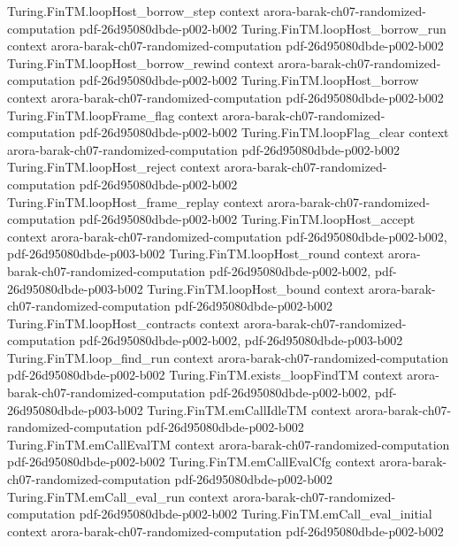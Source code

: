 \begin{theorem}
  {Turing.FinTM.loopHost_borrow_step}
  {context}
  {arora-barak-ch07-randomized-computation}
  {pdf-26d95080dbde-p002-b002}
\proofstep
  {Turing.FinTM.loopHost_borrow_run}
  {context}
  {arora-barak-ch07-randomized-computation}
  {pdf-26d95080dbde-p002-b002}
\proofstep
  {Turing.FinTM.loopHost_borrow_rewind}
  {context}
  {arora-barak-ch07-randomized-computation}
  {pdf-26d95080dbde-p002-b002}
\proofstep
  {Turing.FinTM.loopHost_borrow}
  {context}
  {arora-barak-ch07-randomized-computation}
  {pdf-26d95080dbde-p002-b002}
\proofstep
  {Turing.FinTM.loopFrame_flag}
  {context}
  {arora-barak-ch07-randomized-computation}
  {pdf-26d95080dbde-p002-b002}
\proofstep
  {Turing.FinTM.loopFlag_clear}
  {context}
  {arora-barak-ch07-randomized-computation}
  {pdf-26d95080dbde-p002-b002}
\proofstep
  {Turing.FinTM.loopHost_reject}
  {context}
  {arora-barak-ch07-randomized-computation}
  {pdf-26d95080dbde-p002-b002}
\proofstep
  {Turing.FinTM.loopHost_frame_replay}
  {context}
  {arora-barak-ch07-randomized-computation}
  {pdf-26d95080dbde-p002-b002}
\proofstep
  {Turing.FinTM.loopHost_accept}
  {context}
  {arora-barak-ch07-randomized-computation}
  {pdf-26d95080dbde-p002-b002,
    pdf-26d95080dbde-p003-b002}
\proofstep
  {Turing.FinTM.loopHost_round}
  {context}
  {arora-barak-ch07-randomized-computation}
  {pdf-26d95080dbde-p002-b002,
    pdf-26d95080dbde-p003-b002}
\proofstep
  {Turing.FinTM.loopHost_bound}
  {context}
  {arora-barak-ch07-randomized-computation}
  {pdf-26d95080dbde-p002-b002}
\proofstep
  {Turing.FinTM.loopHost_contracts}
  {context}
  {arora-barak-ch07-randomized-computation}
  {pdf-26d95080dbde-p002-b002,
    pdf-26d95080dbde-p003-b002}
\proofstep
  {Turing.FinTM.loop_find_run}
  {context}
  {arora-barak-ch07-randomized-computation}
  {pdf-26d95080dbde-p002-b002}
\proofstep
  {Turing.FinTM.exists_loopFindTM}
  {context}
  {arora-barak-ch07-randomized-computation}
  {pdf-26d95080dbde-p002-b002,
    pdf-26d95080dbde-p003-b002}
\proofstep
  {Turing.FinTM.emCallIdleTM}
  {context}
  {arora-barak-ch07-randomized-computation}
  {pdf-26d95080dbde-p002-b002}
\proofstep
  {Turing.FinTM.emCallEvalTM}
  {context}
  {arora-barak-ch07-randomized-computation}
  {pdf-26d95080dbde-p002-b002}
\proofstep
  {Turing.FinTM.emCallEvalCfg}
  {context}
  {arora-barak-ch07-randomized-computation}
  {pdf-26d95080dbde-p002-b002}
\proofstep
  {Turing.FinTM.emCall_eval_run}
  {context}
  {arora-barak-ch07-randomized-computation}
  {pdf-26d95080dbde-p002-b002}
\proofstep
  {Turing.FinTM.emCall_eval_initial}
  {context}
  {arora-barak-ch07-randomized-computation}
  {pdf-26d95080dbde-p002-b002}

\end{theorem}

